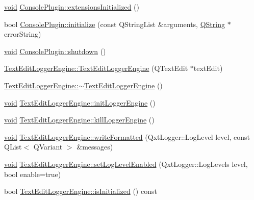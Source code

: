 \begin{DoxyCompactItemize}
\item 
\hyperlink{group___u_a_v_objects_plugin_ga444cf2ff3f0ecbe028adce838d373f5c}{void} \hyperlink{group___console_plugin_ga85a6a6c06db877c20f7a07d780d8b475}{\-Console\-Plugin\-::extensions\-Initialized} ()
\item 
bool \hyperlink{group___console_plugin_ga16272a47e2f07a68477d2c8c949dd1a7}{\-Console\-Plugin\-::initialize} (const \-Q\-String\-List \&arguments, \hyperlink{group___u_a_v_objects_plugin_gab9d252f49c333c94a72f97ce3105a32d}{\-Q\-String} $\ast$error\-String)
\item 
\hyperlink{group___u_a_v_objects_plugin_ga444cf2ff3f0ecbe028adce838d373f5c}{void} \hyperlink{group___console_plugin_gaa3ff74c08dc36f2a1ba79357ab45319a}{\-Console\-Plugin\-::shutdown} ()
\item 
\hyperlink{group___console_plugin_gaf57b0c5ea1591a2931695b3e58c8d298}{\-Text\-Edit\-Logger\-Engine\-::\-Text\-Edit\-Logger\-Engine} (\-Q\-Text\-Edit $\ast$text\-Edit)
\item 
\hyperlink{group___console_plugin_gaf9f579c5f0cbb1b08f7fcd3bd30f8964}{\-Text\-Edit\-Logger\-Engine\-::$\sim$\-Text\-Edit\-Logger\-Engine} ()
\item 
\hyperlink{group___u_a_v_objects_plugin_ga444cf2ff3f0ecbe028adce838d373f5c}{void} \hyperlink{group___console_plugin_gad4e7c7170672faefa715053b281859c2}{\-Text\-Edit\-Logger\-Engine\-::init\-Logger\-Engine} ()
\item 
\hyperlink{group___u_a_v_objects_plugin_ga444cf2ff3f0ecbe028adce838d373f5c}{void} \hyperlink{group___console_plugin_ga54411c88e44357048e786fb83d2abb21}{\-Text\-Edit\-Logger\-Engine\-::kill\-Logger\-Engine} ()
\item 
\hyperlink{group___u_a_v_objects_plugin_ga444cf2ff3f0ecbe028adce838d373f5c}{void} \hyperlink{group___console_plugin_ga2a9c1df4120a7ceeb25bafac4682e695}{\-Text\-Edit\-Logger\-Engine\-::write\-Formatted} (\-Qxt\-Logger\-::\-Log\-Level level, const \-Q\-List$<$ \-Q\-Variant $>$ \&messages)
\item 
\hyperlink{group___u_a_v_objects_plugin_ga444cf2ff3f0ecbe028adce838d373f5c}{void} \hyperlink{group___console_plugin_ga45c5e0aeca53547cd9b538c3cd428689}{\-Text\-Edit\-Logger\-Engine\-::set\-Log\-Level\-Enabled} (\-Qxt\-Logger\-::\-Log\-Levels level, bool enable=true)
\item 
bool \hyperlink{group___console_plugin_gaaf31edb9cfde3ba4fca139b77f04c0a5}{\-Text\-Edit\-Logger\-Engine\-::is\-Initialized} () const 
\end{DoxyCompactItemize}


